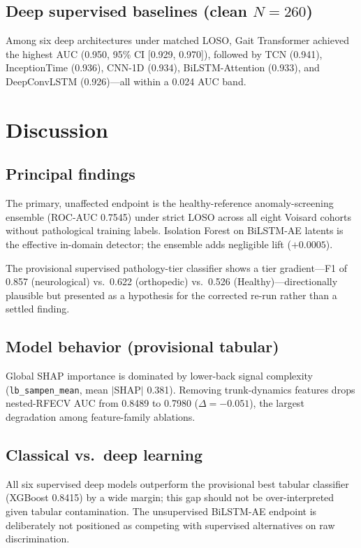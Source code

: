 \subsection{Deep supervised baselines (clean $N=260$)}

Among six deep architectures under matched LOSO, Gait Transformer achieved the highest AUC (0.950, 95\% CI [0.929, 0.970]), followed by TCN (0.941), InceptionTime (0.936), CNN-1D (0.934), BiLSTM-Attention (0.933), and DeepConvLSTM (0.926)---all within a 0.024 AUC band.

\section{Discussion}

\subsection{Principal findings}

The primary, unaffected endpoint is the healthy-reference anomaly-screening ensemble (ROC-AUC 0.7545) under strict LOSO across all eight Voisard cohorts without pathological training labels. Isolation Forest on BiLSTM-AE latents is the effective in-domain detector; the ensemble adds negligible lift ($+0.0005$).

The provisional supervised pathology-tier classifier shows a tier gradient---F1 of 0.857 (neurological) vs.\ 0.622 (orthopedic) vs.\ 0.526 (Healthy)---directionally plausible but presented as a hypothesis for the corrected re-run rather than a settled finding.

\subsection{Model behavior (provisional tabular)}

Global SHAP importance is dominated by lower-back signal complexity (\texttt{lb\_sampen\_mean}, mean $|$SHAP$|$ 0.381). Removing trunk-dynamics features drops nested-RFECV AUC from 0.8489 to 0.7980 ($\Delta=-0.051$), the largest degradation among feature-family ablations.

\subsection{Classical vs.\ deep learning}

All six supervised deep models outperform the provisional best tabular classifier (XGBoost 0.8415) by a wide margin; this gap should not be over-interpreted given tabular contamination. The unsupervised BiLSTM-AE endpoint is deliberately not positioned as competing with supervised alternatives on raw discrimination.

